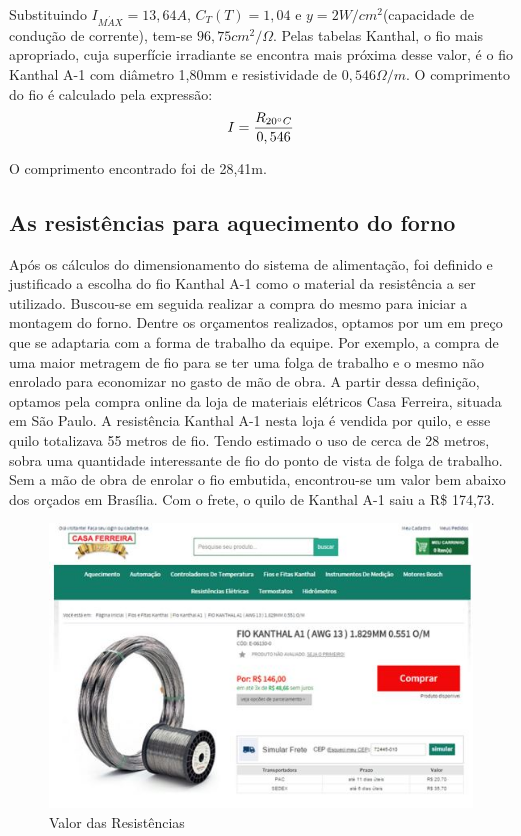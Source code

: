 Substituindo $I_{M\acute{A}X}=13,64A$, $C_T(T)=1,04$ e $y=2W/cm^{2}$(capacidade de condução de corrente), tem-se $96,75 cm^{2} / \Omega$. Pelas tabelas Kanthal, o fio mais apropriado, cuja superfície irradiante se encontra mais próxima desse valor, é o fio Kanthal A-1 com diâmetro 1,80mm e resistividade de $0,546\Omega /m$. O comprimento do fio é calculado pela expressão:
\begin{gather}
    I = \frac{R_{20 \degree C}}{0,546}
\end{gather}

O comprimento encontrado foi de 28,41m.

\subsection{As resistências para aquecimento do forno}
Após os cálculos do dimensionamento do sistema de alimentação, foi definido e justificado a escolha do fio Kanthal A-1 como o material da resistência a ser utilizado.
Buscou-se em seguida realizar a compra do mesmo para iniciar a montagem do forno. Dentre os orçamentos realizados, optamos por um em preço que se adaptaria com a forma de trabalho da equipe. Por exemplo, a compra de uma maior metragem de fio para se ter uma folga de trabalho e o mesmo não enrolado para economizar no gasto de mão de obra.
A partir dessa definição, optamos pela compra online da loja de materiais elétricos Casa Ferreira, situada em São Paulo. A resistência Kanthal A-1 nesta loja é vendida por quilo, e esse quilo totalizava 55 metros de fio. Tendo estimado o uso de cerca de 28 metros, sobra uma quantidade interessante de fio do ponto de vista de folga de trabalho. Sem a mão de obra de enrolar o fio embutida, encontrou-se um valor bem abaixo dos orçados em Brasília. Com o frete, o quilo de Kanthal A-1 saiu a R\$ 174,73.
\begin{figure}[!h]
	\centering
	\label{resistencia1}
	\includegraphics[keepaspectratio=true,scale=1.0]{figuras/alimentacao1.JPG}
	\caption{Valor das Resistências}
\end{figure}

